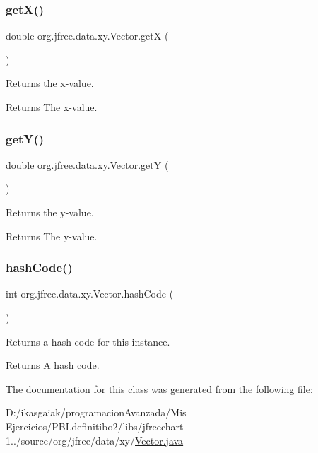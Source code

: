 \subsubsection{\texorpdfstring{get\+X()}{getX()}}
{\footnotesize\ttfamily double org.\+jfree.\+data.\+xy.\+Vector.\+getX (\begin{DoxyParamCaption}{ }\end{DoxyParamCaption})}

Returns the x-\/value.

\begin{DoxyReturn}{Returns}
The x-\/value. 
\end{DoxyReturn}
\mbox{\label{classorg_1_1jfree_1_1data_1_1xy_1_1_vector_a3eedb42b5e205ea7e1c65186ea376446}} 
\subsubsection{\texorpdfstring{get\+Y()}{getY()}}
{\footnotesize\ttfamily double org.\+jfree.\+data.\+xy.\+Vector.\+getY (\begin{DoxyParamCaption}{ }\end{DoxyParamCaption})}

Returns the y-\/value.

\begin{DoxyReturn}{Returns}
The y-\/value. 
\end{DoxyReturn}
\mbox{\label{classorg_1_1jfree_1_1data_1_1xy_1_1_vector_a14f5ca529b38c757fda3788b62fd0aa5}} 
\subsubsection{\texorpdfstring{hash\+Code()}{hashCode()}}
{\footnotesize\ttfamily int org.\+jfree.\+data.\+xy.\+Vector.\+hash\+Code (\begin{DoxyParamCaption}{ }\end{DoxyParamCaption})}

Returns a hash code for this instance.

\begin{DoxyReturn}{Returns}
A hash code. 
\end{DoxyReturn}


The documentation for this class was generated from the following file\+:\begin{DoxyCompactItemize}
\item 
D\+:/ikasgaiak/programacion\+Avanzada/\+Mis Ejercicios/\+P\+B\+Ldefinitibo2/libs/jfreechart-\/1../source/org/jfree/data/xy/\mbox{\hyperlink{_vector_8java}{Vector.\+java}}\end{DoxyCompactItemize}
